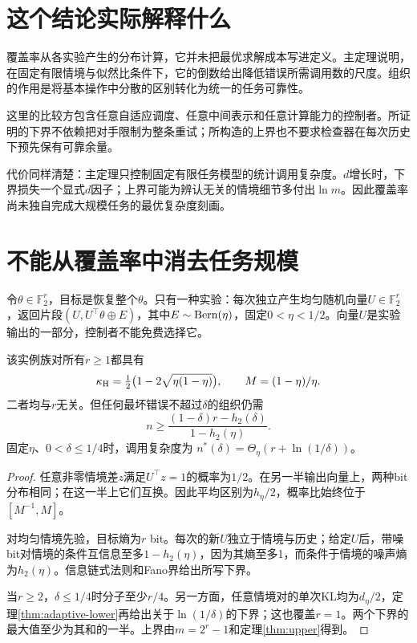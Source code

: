 \section{这个结论实际解释什么}
覆盖率从各实验产生的分布计算，它并未把最优求解成本写进定义。主定理说明，在固定有限情境与似然比条件下，它的倒数给出降低错误所需调用数的尺度。组织的作用是将基本操作中分散的区别转化为统一的任务可靠性。

这里的比较方包含任意自适应调度、任意中间表示和任意计算能力的控制者。所证明的下界不依赖把对手限制为整条重试；所构造的上界也不要求检查器在每次历史下预先保有可靠余量。

代价同样清楚：主定理只控制固定有限任务模型的统计调用复杂度。$d$增长时，下界损失一个显式$d$因子；上界可能为辨认无关的情境细节多付出$\ln m$。因此覆盖率尚未独自完成大规模任务的最优复杂度刻画。

\section{不能从覆盖率中消去任务规模}
令$\theta\in\mathbb F_2^r$，目标是恢复整个$\theta$。只有一种实验：每次独立产生均匀随机向量$U\in\mathbb F_2^r$，返回片段$(U,U^\top\theta\oplus E)$，其中$E\sim\operatorname{Bern}(\eta)$，固定$0<\eta<1/2$。向量$U$是实验输出的一部分，控制者不能免费选择它。

\begin{theorem}[相同覆盖率下的规模增长]
\label{thm:dimension}
该实例族对所有$r\ge1$都具有
\[
 \kappa_{\mathrm H}=\tfrac12\bigl(1-2\sqrt{\eta(1-\eta)}\bigr),
 \qquad M=(1-\eta)/\eta.
\]
二者均与$r$无关。但任何最坏错误不超过$\delta$的组织仍需
\[
 n\ge\frac{(1-\delta)r-h_2(\delta)}{1-h_2(\eta)}.
\]
固定$\eta$、$0<\delta\le1/4$时，调用复杂度为
$n^*(\delta)=\Theta_\eta(r+\ln(1/\delta))$。
\end{theorem}
\begin{proof}
任意非零情境差$z$满足$U^\top z=1$的概率为$1/2$。在另一半输出向量上，两种bit分布相同；在这一半上它们互换。因此平均区别为$h_\eta/2$，概率比始终位于$[M^{-1},M]$。

对均匀情境先验，目标熵为$r$ bit。每次的新$U$独立于情境与历史；给定$U$后，带噪bit对情境的条件互信息至多$1-h_2(\eta)$，因为其熵至多1，而条件于情境的噪声熵为$h_2(\eta)$。信息链式法则和Fano界给出所写下界。

当$r\ge2$，$\delta\le1/4$时分子至少$r/4$。另一方面，任意情境对的单次KL均为$d_\eta/2$，定理\ref{thm:adaptive-lower}再给出关于$\ln(1/\delta)$的下界；这也覆盖$r=1$。两个下界的最大值至少为其和的一半。上界由$m=2^r-1$和定理\ref{thm:upper}得到。
\end{proof}

